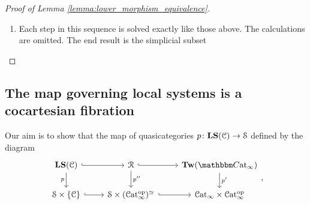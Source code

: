 \documentclass[main.tex]{subfiles}
\begin{document}
\begin{proof}[Proof of Lemma \ref{lemma:lower_morphism_equivalence}]
\begin{enumerate}
\begin{itemize}
\begin{itemize}
            \item For $n \geq 4$, all scaled and marked simplices belong to $\S^{\mathcal{A}'}$ by \hyperref[lemma:subset_of_simplex_contains_k_simplices]{Lemma~\ref*{lemma:subset_of_simplex_contains_k_simplices}}.
          \end{itemize}
          The basal sets are of the form
          \begin{equation*}
            \{k, a_{1}, \ldots, a_{n-k}, \overline{k-1}, \ldots, \overline{1}\},
          \end{equation*}
          where each $a_{1}$, \dots, $a_{n-k}$ is of the form $\ell$ or $\overline{\ell}$ for $k+1 \leq \ell \leq n$. In each case, the simplex $\{a_{n-k}, \overline{k}, \overline{k-1}\}$ is scaled. Thus, the conditions of the \hyperref[lemma:pivot_trick]{Pivot Trick}, the top morphism is marked-scaled anodyne.
      \end{itemize}

      We have now added the simplices promised in part 1., and are left with the simplicial subset $\S^{\mathcal{A}_{2}}_{[2n+1]}$, where
      \begin{equation*}
        \mathcal{A}_{2}
        = \left\{ \substack{ \{\overline{n}, \ldots, \overline{1}\} \\ \{0, 1\} \\ \{1, \overline{1}\} \\ \vdots \\ \{n, \overline{n}\} } \right\}.
      \end{equation*}

    \item Each step in this sequence is solved exactly like those above. The calculations are omitted. The end result is the simplicial subset

  \end{enumerate}
\end{proof}

\subsection{The map governing local systems is a cocartesian fibration}
\label{ssc:the_fibration}

Our aim is to show that the map of quasicategories $p\colon \mathbf{LS}(\mathcal{C}) \to \mathcal{S}$ defined by the diagram
\begin{equation*}
  \begin{tikzcd}
    \LS(\category{C})
    \arrow[r, hook]
    \arrow[d, swap, "p"]
    & \mathcal{R}
    \arrow[r, hook]
    \arrow[d, "p''"]
    & \Tw(\ICCat)
    \arrow[d, "p'"]
    \\
    \S \times \{\category{C}\}
    \arrow[r, hook]
    & \S \times (\ICat\op)^{\simeq}
    \arrow[r, hook]
    & \ICat \times \ICat\op
  \end{tikzcd},
\end{equation*}
\end{document}
